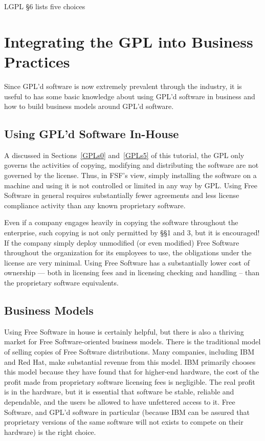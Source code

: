 \documentclass[12pt]{report}
\begin{document}
LGPL \S 6 lists five choices 



\chapter{Integrating the GPL into Business Practices}

Since GPL'd software is now extremely prevalent through the industry, it
is useful to has some basic knowledge about using GPL'd software in
business and how to build business models around GPL'd software.

\section{Using GPL'd Software In-House}

A discussed in Sections~\ref{GPLs0} and~\ref{GPLs5} of this tutorial, the
GPL only governs the activities of copying, modifying and distributing the
software are not governed by the license.  Thus, in FSF's view, simply
installing the software on a machine and using it is not controlled or
limited in any way by GPL\@.  Using Free Software in general requires
substantially fewer agreements and less license compliance activity than
any known proprietary software.

Even if a company engages heavily in copying the software throughout the
enterprise, such copying is not only permitted by \S\S 1 and 3, but it is
encouraged!  If the company simply deploy unmodified (or even modified)
Free Software throughout the organization for its employees to use, the
obligations under the license are very minimal.  Using Free Software has a
substantially lower cost of ownership --- both in licensing fees and in
licensing checking and handling -- than the proprietary software
equivalents.

\section{Business Models}
\label{Business Models}

Using Free Software in house is certainly helpful, but there is also a
thriving market for Free Software-oriented business models.  There is the
traditional model of selling copies of Free Software distributions.  Many
companies, including IBM and Red Hat, make substantial revenue from this
model.  IBM primarily chooses this model because they have found that for
higher-end hardware, the cost of the profit made from proprietary software
licensing fees is negligible.  The real profit is in the hardware, but it is
essential that software be stable, reliable and dependable, and the users
be allowed to have unfettered access to it.  Free Software, and GPL'd
software in particular (because IBM can be assured that proprietary
versions of the same software will not exists to compete on their
hardware) is the right choice.
\end{document}
